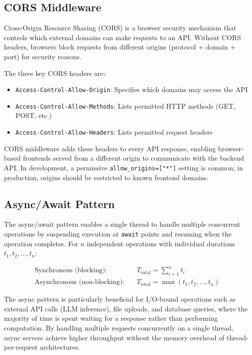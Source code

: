 \documentclass[10pt,a4paper]{article}
\begin{document}
\subsection{CORS Middleware}
\label{sec:cors}

Cross-Origin Resource Sharing (CORS) is a browser security mechanism that controls which external domains can make requests to an API. Without CORS headers, browsers block requests from different origins (protocol + domain + port) for security reasons.

The three key CORS headers are:

\begin{itemize}
    \item \texttt{Access-Control-Allow-Origin}: Specifies which domains may access the API
    \item \texttt{Access-Control-Allow-Methods}: Lists permitted HTTP methods (GET, POST, etc.)
    \item \texttt{Access-Control-Allow-Headers}: Lists permitted request headers
\end{itemize}

CORS middleware adds these headers to every API response, enabling browser-based frontends served from a different origin to communicate with the backend API. In development, a permissive \texttt{allow\_origins=["*"]} setting is common; in production, origins should be restricted to known frontend domains.

\subsection{Async/Await Pattern}
\label{sec:async-await}

The async/await pattern enables a single thread to handle multiple concurrent operations by suspending execution at \texttt{await} points and resuming when the operation completes. For $n$ independent operations with individual durations $t_1, t_2, \ldots, t_n$:

\begin{align}
\text{Synchronous (blocking):} \quad & T_{\text{total}} = \sum_{i=1}^{n} t_i \label{eq:sync-time} \\
\text{Asynchronous (non-blocking):} \quad & T_{\text{total}} = \max(t_1, t_2, \ldots, t_n) \label{eq:async-time}
\end{align}

The async pattern is particularly beneficial for I/O-bound operations such as external API calls (LLM inference), file uploads, and database queries, where the majority of time is spent waiting for a response rather than performing computation. By handling multiple requests concurrently on a single thread, async servers achieve higher throughput without the memory overhead of thread-per-request architectures.
\end{document}
